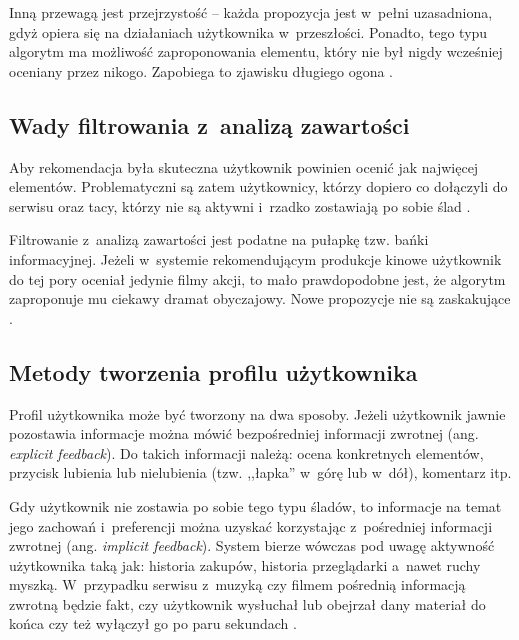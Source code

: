 \documentclass[twoside]{iisthesis}
\begin{document}
	 Inną przewagą jest przejrzystość -- każda propozycja jest w~pełni uzasadniona, gdyż opiera się na działaniach użytkownika w~przeszłości. Ponadto, tego typu algorytm ma możliwość zaproponowania elementu, który nie był nigdy wcześniej oceniany przez nikogo. Zapobiega to zjawisku długiego ogona \cite{id:ContentBasedRecommenderSystemsState}.
	 
	 \subsection{Wady filtrowania z~analizą zawartości}
	 Aby rekomendacja była skuteczna użytkownik powinien ocenić jak najwięcej elementów. Problematyczni są zatem użytkownicy, którzy dopiero co dołączyli do serwisu oraz tacy, którzy nie są aktywni i~rzadko zostawiają po sobie ślad \cite{id:MaleszkaMianowskaNguyenmethod}.
	 
	 Filtrowanie z~analizą zawartości jest podatne na pułapkę tzw. bańki informacyjnej. Jeżeli w~systemie rekomendującym produkcje kinowe użytkownik do tej pory oceniał jedynie filmy akcji, to mało prawdopodobne jest, że algorytm zaproponuje mu ciekawy dramat obyczajowy. Nowe propozycje nie są zaskakujące \cite{id:ContentBasedRecommenderSystemsState}.
	 	 
	 \subsection{Metody tworzenia profilu użytkownika}
	 \label{ss:metody_tworzenia_profilu_uzytkownika}
	 
	 Profil użytkownika może być tworzony na dwa sposoby. Jeżeli użytkownik jawnie pozostawia informacje można mówić bezpośredniej informacji zwrotnej (ang. \textit{explicit feedback}). Do takich informacji należą: ocena konkretnych elementów, przycisk lubienia lub nielubienia (tzw. ,,łapka'' w~górę lub w~dół), komentarz itp. 
	 
	 Gdy użytkownik nie zostawia po sobie tego typu śladów, to informacje na temat jego zachowań i~preferencji można uzyskać korzystając z~pośredniej informacji zwrotnej (ang. \textit{implicit feedback}). System bierze wówczas pod uwagę aktywność użytkownika taką jak: historia zakupów, historia przeglądarki a~nawet ruchy myszką. W~przypadku serwisu z~muzyką czy filmem pośrednią informacją zwrotną będzie fakt, czy użytkownik wysłuchał lub obejrzał dany materiał do końca czy też wyłączył go po paru sekundach \cite{id:AdvancesInCollaborativeFiltering,id:ContentBasedRecommenderSystemsState}.
	 
\end{document}
